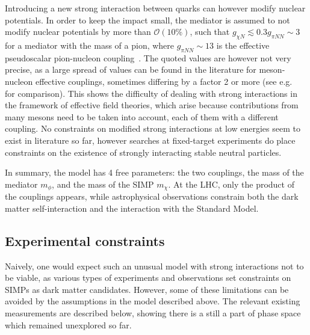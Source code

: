 Introducing a new strong interaction between quarks can however modify nuclear potentials. In order to keep the impact small, the mediator is assumed to not modify nuclear potentials by more than $\mathcal{O}(10\%)$, such that $g_{\chi N} \lesssim 0.3g_{\pi NN}\sim 3$ for a mediator with the mass of a pion, where $g_{\pi NN} \sim 13$ is the effective pseudoscalar pion-nucleon coupling~\cite{Donoghue:1992dd}. The quoted values are however not very precise, as a large spread of values can be found in the literature for meson-nucleon effective couplings, sometimes differing by a factor 2 or more (see e.g.~\cite{Downum:2006re} for comparison). This shows the difficulty of dealing with strong interactions in the framework of effective field theories, which arise because contributions from many mesons need to be taken into account, each of them with a different coupling. No constraints on modified strong interactions at low energies seem to exist in literature so far, however searches at fixed-target experiments do place constraints on the existence of strongly interacting stable neutral particles.

In summary, the model has 4 free parameters: the two couplings, the mass of the mediator $m_{\phi}$, and the mass of the \ac{SIMP} $m_{\chi}$. At the \ac{LHC}, only the product of the couplings appears, while astrophysical observations constrain both the dark matter self-interaction and the interaction with the Standard Model.

\subsection{Experimental constraints}
\label{sec:SIMP_constraints}

Naively, one would expect such an unusual model with strong interactions not to be viable, as various types of experiments and observations set constraints on \acp{SIMP} as dark matter candidates. However, some of these limitations can be avoided by the assumptions in the model described above. The relevant existing measurements are described below, showing there is a still a part of phase space which remained unexplored so far.

